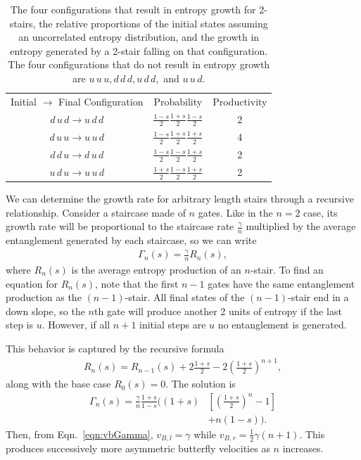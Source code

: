 \documentclass[aps,prx,reprint,superscriptaddress, longbibliography]{revtex4-1}
\newcommand{\half}{\frac{1}{2}}
\begin{document}
\begin{table}
	\centering
	\begin{tabular}{ccc}
		Initial $\to$ Final 
		Configuration        & Probability         & Productivity\\
		$d\,u\,d\to u\,d\,d$ & $\frac{1-s}{2}\frac{1+s}{2}\frac{1-s}{2}$ & 2\\
		$d\,u\,u\to u\,u\,d$ & $\frac{1-s}{2}\frac{1+s}{2}\frac{1+s}{2}$ & 4\\
		$d\,d\,u\to d\,u\,d$ & $\frac{1-s}{2}\frac{1-s}{2}\frac{1+s}{2}$ & 2\\
		$u\,d\,u\to u\,u\,d$ & $\frac{1+s}{2}\frac{1-s}{2}\frac{1+s}{2}$ & 2
	\end{tabular}
	\caption{The four configurations that result in entropy growth for 2-stairs, the relative proportions of the initial states assuming an uncorrelated entropy distribution, and the growth in entropy generated by a 2-stair falling on that configuration. The four configurations that do not result in entropy growth are $u\,u\,u, d\,d\,d, u\,d\,d,$ and $u\,u\,d$.}
	\label{tab:2stair}
\end{table}

We can determine the growth rate for arbitrary length stairs through a recursive relationship. Consider a staircase made of $n$ gates. Like in the $n=2$ case, its growth rate will be proportional to the staircase rate $\frac{\gamma}{n}$ multiplied by the average entanglement generated by each staircase, so we can write
\begin{align}
\Gamma_n(s) = \frac{\gamma}{n}R_n(s), \label{eqn:growthrate}
\end{align}
where $R_n(s)$ is the average entropy production of an $n$-stair. To find an equation for $R_n(s)$, note that the first $n-1$ gates have the same entanglement production as the $(n-1)$-stair. All final states of the $(n-1)$-stair end in a down slope, so the $n$th gate will produce another 2 units of entropy if the last step is $u$. However, if all $n+1$ initial steps are $u$ no entanglement is generated. 

This behavior is captured by the recursive formula
\begin{align}
R_n(s) = R_{n-1}(s)+2\frac{1+s}{2} - 2\left(\frac{1+s}{2}\right)^{n+1}, \label{eqn:raterecur}
\end{align}
along with the base case $R_0(s)=0$. The solution is
\begin{align}
\Gamma_n(s) = \frac{\gamma}{n}\frac{1+s}{1-s}\bigg(
(1+s)&\left[\left(\frac{1+s}{2}\right)^n-1\right]\nonumber \\
&+n(1-s)\bigg). \label{eqn:growthrate}
\end{align}
Then, from Eqn.~\ref{eqn:vbGamma}, $v_{B,l}=\gamma$ while $v_{B,r}=\half\gamma(n+1)$.
This produces successively more asymmetric butterfly velocities as $n$ increases. 
\end{document}
